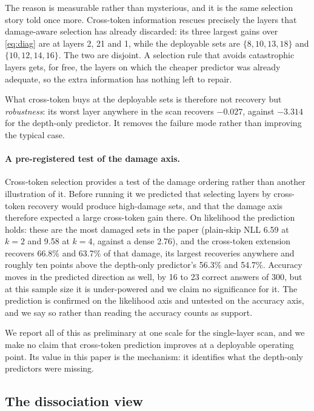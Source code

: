 The reason is measurable rather than mysterious, and it is the same selection story told
once more. Cross-token information rescues precisely the layers that damage-aware selection
has already discarded: its three largest gains over \cref{eq:diag} are at layers 2,
21 and 1, while the deployable sets are $\{8,10,13,18\}$ and
$\{10,12,14,16\}$. The two are disjoint. A selection rule that avoids catastrophic layers
gets, for free, the layers on which the cheaper predictor was already adequate, so the extra
information has nothing left to repair.

What cross-token buys at the deployable sets is therefore not recovery but
\emph{robustness}: its worst layer anywhere in the scan recovers $-0.027$, against
$-3.314$ for the depth-only predictor. It removes the failure mode rather than
improving the typical case.

\paragraph{A pre-registered test of the damage axis.} Cross-token selection provides a test of
the damage ordering rather than another illustration of it. Before running it we predicted
that selecting layers by cross-token recovery would produce high-damage sets, and that the
damage axis therefore expected a large cross-token gain there. On likelihood the prediction
holds: these are the most damaged sets in the paper (plain-skip NLL 6.59 at $k=2$ and
9.58 at $k=4$, against a dense 2.76), and the cross-token extension recovers
66.8\% and 63.7\% of that damage, its largest recoveries anywhere and roughly ten
points above the depth-only predictor's 56.3\% and 54.7\%. Accuracy moves in the predicted direction as well, by
16 to 23 correct answers of 300, but at this sample size it is
under-powered and we claim no significance for it. The prediction is confirmed on the
likelihood axis and untested on the accuracy axis, and we say so rather than reading the
accuracy counts as support.

We report all of this as preliminary at one scale for the single-layer scan, and we make no
claim that cross-token prediction improves \mname at a deployable operating point. Its value
in this paper is the mechanism: it identifies what the depth-only predictors were missing.

\subsection{The dissociation view}


